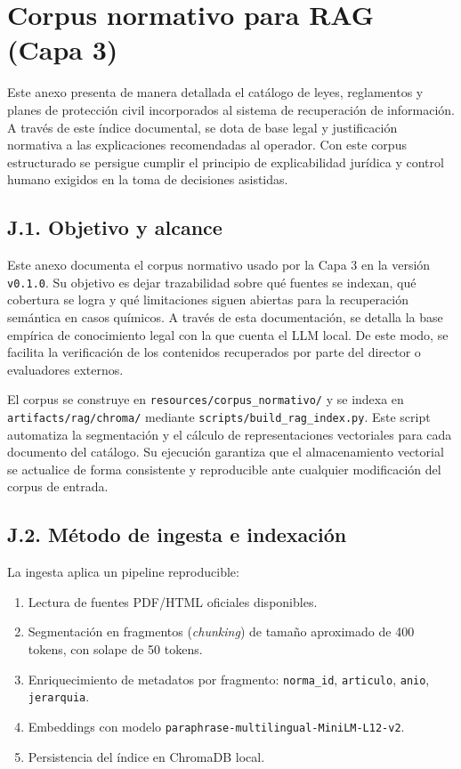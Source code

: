 \chapter{Corpus normativo para RAG (Capa 3)}
\label{cap:anexoj}

Este anexo presenta de manera detallada el catálogo de leyes, reglamentos y planes de protección civil incorporados al sistema de recuperación de información. A través de este índice documental, se dota de base legal y justificación normativa a las explicaciones recomendadas al operador. Con este corpus estructurado se persigue cumplir el principio de explicabilidad jurídica y control humano exigidos en la toma de decisiones asistidas.

\section*{J.1. Objetivo y alcance}

Este anexo documenta el corpus normativo usado por la Capa 3 en la versión \texttt{v0.1.0}. Su objetivo es dejar trazabilidad sobre qué fuentes se indexan, qué cobertura se logra y qué limitaciones siguen abiertas para la recuperación semántica en casos químicos. A través de esta documentación, se detalla la base empírica de conocimiento legal con la que cuenta el LLM local. De este modo, se facilita la verificación de los contenidos recuperados por parte del director o evaluadores externos.

El corpus se construye en \texttt{resources/corpus\_normativo/} y se indexa en \texttt{artifacts/rag/chroma/} mediante \texttt{scripts/build\_rag\_index.py}. Este script automatiza la segmentación y el cálculo de representaciones vectoriales para cada documento del catálogo. Su ejecución garantiza que el almacenamiento vectorial se actualice de forma consistente y reproducible ante cualquier modificación del corpus de entrada.

\section*{J.2. Método de ingesta e indexación}

La ingesta aplica un pipeline reproducible:

\begin{enumerate}
    \item Lectura de fuentes PDF/HTML oficiales disponibles.
    \item Segmentación en fragmentos (\textit{chunking}) de tamaño aproximado de 400 tokens,
    con solape de 50 tokens.
    \item Enriquecimiento de metadatos por fragmento:
    \texttt{norma\_id}, \texttt{articulo}, \texttt{anio}, \texttt{jerarquia}.
    \item Embeddings con modelo
    \texttt{paraphrase-multilingual-MiniLM-L12-v2}.
    \item Persistencia del índice en ChromaDB local.
\end{enumerate}

